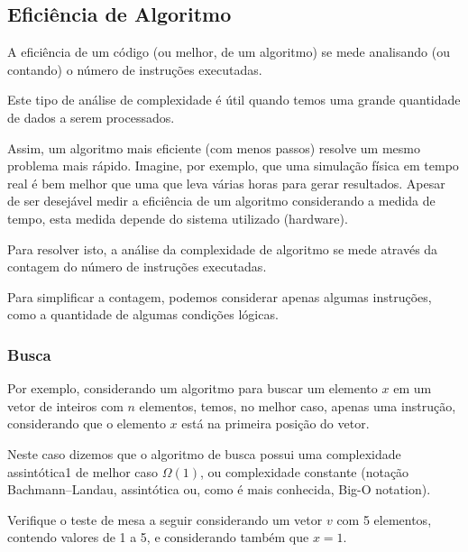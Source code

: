 \documentclass[12pt,a4paper]{article}
\begin{document}
    \hypertarget{eficiuxeancia-de-algoritmo}{%
\subsection{Eficiência de Algoritmo}\label{eficiuxeancia-de-algoritmo}}

    A eficiência de um código (ou melhor, de um algoritmo) se mede
analisando (ou contando) o número de instruções executadas.

Este tipo de análise de complexidade é útil quando temos uma grande
quantidade de dados a serem processados.

Assim, um algoritmo mais eficiente (com menos passos) resolve um mesmo
problema mais rápido. Imagine, por exemplo, que uma simulação física em
tempo real é bem melhor que uma que leva várias horas para gerar
resultados. Apesar de ser desejável medir a eficiência de um algoritmo
considerando a medida de tempo, esta medida depende do sistema utilizado
(hardware).

Para resolver isto, a análise da complexidade de algoritmo se mede
através da contagem do número de instruções executadas.

Para simplificar a contagem, podemos considerar apenas algumas
instruções, como a quantidade de algumas condições lógicas.

    \hypertarget{busca}{%
\subsubsection{Busca}\label{busca}}

Por exemplo, considerando um algoritmo para buscar um elemento \(x\) em
um vetor de inteiros com \(n\) elementos, temos, no melhor caso, apenas
uma instrução, considerando que o elemento \(x\) está na primeira
posição do vetor.

Neste caso dizemos que o algoritmo de busca possui uma complexidade
assintótica1 de melhor caso \(\Omega(1)\), ou complexidade constante
(notação Bachmann--Landau, assintótica ou, como é mais conhecida, Big-O
notation).

Verifique o teste de mesa a seguir considerando um vetor \(v\) com 5
elementos, contendo valores de 1 a 5, e considerando também que \(x=1\).
\end{document}

